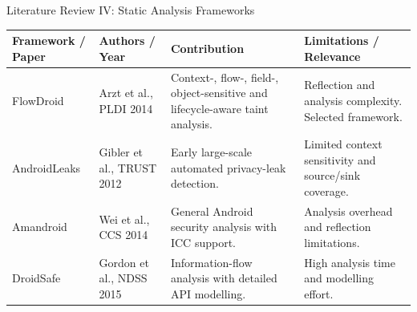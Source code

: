 \documentclass[aspectratio=169,10pt]{beamer}
\newcommand{\tbl}{\footnotesize\setlength{\tabcolsep}{3pt}\renewcommand{\arraystretch}{1.3}}
\begin{document}
\begin{frame}{Literature Review IV: Static Analysis Frameworks}

\begin{table}
\centering
\tbl

\begin{tabular}{|L{.15}|L{.15}|L{.31}|L{.31}|}
\hline

\textbf{Framework / Paper} &
\textbf{Authors / Year} &
\textbf{Contribution} &
\textbf{Limitations / Relevance}\\
\hline

FlowDroid &
Arzt et al., PLDI 2014 &
Context-, flow-, field-, object-sensitive and lifecycle-aware taint analysis. &
Reflection and analysis complexity. Selected framework.\\
\hline

AndroidLeaks &
Gibler et al., TRUST 2012 &
Early large-scale automated privacy-leak detection. &
Limited context sensitivity and source/sink coverage.\\
\hline

Amandroid &
Wei et al., CCS 2014 &
General Android security analysis with ICC support. &
Analysis overhead and reflection limitations.\\
\hline

DroidSafe &
Gordon et al., NDSS 2015 &
Information-flow analysis with detailed API modelling. &
High analysis time and modelling effort.\\
\hline

\end{tabular}
\end{table}

\end{frame}

\end{document}
